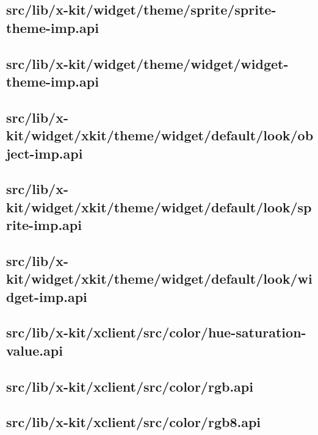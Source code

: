 \subsection{src/lib/x-kit/widget/theme/sprite/sprite-theme-imp.api}


\subsection{src/lib/x-kit/widget/theme/widget/widget-theme-imp.api}


\subsection{src/lib/x-kit/widget/xkit/theme/widget/default/look/object-imp.api}


\subsection{src/lib/x-kit/widget/xkit/theme/widget/default/look/sprite-imp.api}


\subsection{src/lib/x-kit/widget/xkit/theme/widget/default/look/widget-imp.api}


\subsection{src/lib/x-kit/xclient/src/color/hue-saturation-value.api}


\subsection{src/lib/x-kit/xclient/src/color/rgb.api}


\subsection{src/lib/x-kit/xclient/src/color/rgb8.api}


